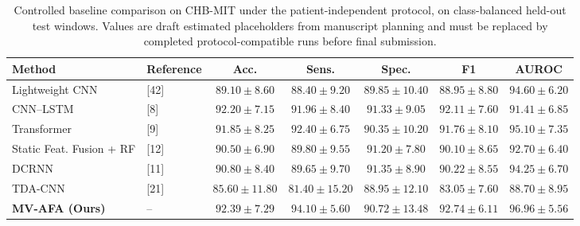 \begin{table}[t]
\centering
\caption{Controlled baseline comparison on CHB-MIT under the patient-independent protocol, on class-balanced held-out test windows. Values are draft estimated placeholders from manuscript planning and must be replaced by completed protocol-compatible runs before final submission.}
\label{tab:controlled_baseline_chbmit_placeholder}
\begin{tabular}{llccccc}
\toprule
Method & Reference & Acc. & Sens. & Spec. & F1 & AUROC \\
\midrule
Lightweight CNN & [42] & $89.10 \pm 8.60$ & $88.40 \pm 9.20$ & $89.85 \pm 10.40$ & $88.95 \pm 8.80$ & $94.60 \pm 6.20$ \\
CNN--LSTM & [8] & $92.20 \pm 7.15$ & $91.96 \pm 8.40$ & $91.33 \pm 9.05$ & $92.11 \pm 7.60$ & $91.41 \pm 6.85$ \\
Transformer & [9] & $91.85 \pm 8.25$ & $92.40 \pm 6.75$ & $90.35 \pm 10.20$ & $91.76 \pm 8.10$ & $95.10 \pm 7.35$ \\
Static Feat. Fusion + RF & [12] & $90.50 \pm 6.90$ & $89.80 \pm 9.55$ & $91.20 \pm 7.80$ & $90.10 \pm 8.65$ & $92.70 \pm 6.40$ \\
DCRNN & [11] & $90.80 \pm 8.40$ & $89.65 \pm 9.70$ & $91.35 \pm 8.90$ & $90.22 \pm 8.55$ & $94.25 \pm 6.70$ \\
TDA-CNN & [21] & $85.60 \pm 11.80$ & $81.40 \pm 15.20$ & $88.95 \pm 12.10$ & $83.05 \pm 7.60$ & $88.70 \pm 8.95$ \\
\textbf{MV-AFA (Ours)} & -- & $\mathbf{92.39 \pm 7.29}$ & $\mathbf{94.10 \pm 5.60}$ & $\mathbf{90.72 \pm 13.48}$ & $\mathbf{92.74 \pm 6.11}$ & $\mathbf{96.96 \pm 5.56}$ \\
\bottomrule
\end{tabular}
\end{table}

